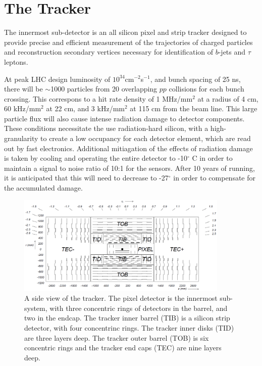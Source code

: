 \section{The Tracker}
\label{tracker_description}

\par The innermost sub-detector is an all silicon pixel and strip
tracker designed to provide precise and efficient measurement of the
trajectories of charged particles and reconstruction secondary
vertices necessary for identification of $b$-jets and $\tau$ leptons.  

\par At peak LHC design luminosity of $10^{34}$cm$^{-2}$s$^{-1}$, and bunch
spacing of 25 ns, there will be $\sim$1000 particles from 20
overlapping $pp$ collisions for each bunch crossing.  This correspons
to a hit rate density of 1 MHz/mm$^{2}$ at a radius of 4 cm, 60
kHz/mm$^{2}$ at 22 cm, and 3 kHz/mm$^{2}$ at 115 cm from the beam
line.  This large particle flux will also cause intense radiation
damage to detector components.  These conditions necessitate the use
radiation-hard silicon, with a high-granularity to create a low
occupancy for each detector element, which are read out by fast
electronics. Additional mitiagation of the effects of radiation damage
is taken by cooling and operating the entire detector to -10$^{\circ}$
C in order to maintain a signal to noise ratio of 10:1 for the
sensors.  After 10 years of running, it is anticipated that this will
need to decrease to -27$^{\circ}$ in order to compensate for the
accumulated damage.    

\begin{figure}[h]
   \centering
  \includegraphics[width=0.9\textwidth]{Figures/CMS_Diagrams/Tracker__Side_View.png}
  \caption{A side view of the tracker.  The pixel detector is the
    innermost sub-system, with three concentric rings of detectors in
    the barrel, and two in the endcap.  The tracker inner barrel (TIB)
  is a silicon strip detector, with four concentrinc rings.  The
  tracker inner disks (TID) are three layers deep.  The tracker outer
  barrel (TOB) is six concentric rings and the tracker end caps (TEC)
  are nine layers deep. } \label{fig:tracker_side}
\end{figure}

